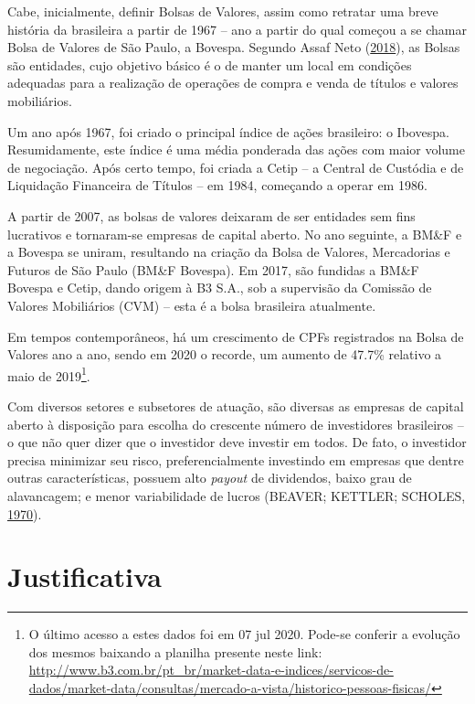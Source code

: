 \documentclass[grad,numbers]{coppe}
\begin{document}
  Cabe, inicialmente, definir Bolsas de Valores, assim como retratar uma breve história da brasileira a partir de 1967 -- ano a partir do qual começou a se chamar Bolsa de Valores de São Paulo, a Bovespa. Segundo Assaf Neto (\protect\hyperlink{ref-assafneto2018}{2018}), as Bolsas são entidades, cujo objetivo básico é o de manter um local em condições adequadas para a realização de operações de compra e venda de títulos e valores mobiliários.
  
  Um ano após 1967, foi criado o principal índice de ações brasileiro: o Ibovespa. Resumidamente, este índice é uma média ponderada das ações com maior volume de negociação. Após certo tempo, foi criada a Cetip -- a Central de Custódia e de Liquidação Financeira de Títulos -- em 1984, começando a operar em 1986.
  
  A partir de 2007, as bolsas de valores deixaram de ser entidades sem fins lucrativos e tornaram-se empresas de capital aberto. No ano seguinte, a BM\&F e a Bovespa se uniram, resultando na criação da Bolsa de Valores, Mercadorias e Futuros de São Paulo (BM\&F Bovespa). Em 2017, são fundidas a BM\&F Bovespa e Cetip, dando origem à B3 S.A., sob a supervisão da Comissão de Valores Mobiliários (CVM) -- esta é a bolsa brasileira atualmente.
  
  Em tempos contemporâneos, há um crescimento de CPFs registrados na Bolsa de Valores ano a ano, sendo em 2020 o recorde, um aumento de 47.7\% relativo a maio de 2019\footnote{O último acesso a estes dados foi em 07 jul 2020. Pode-se conferir a evolução dos mesmos baixando a planilha presente neste link: \url{http://www.b3.com.br/pt_br/market-data-e-indices/servicos-de-dados/market-data/consultas/mercado-a-vista/historico-pessoas-fisicas/}}.
  
  Com diversos setores e subsetores de atuação, são diversas as empresas de capital aberto à disposição para escolha do crescente número de investidores brasileiros -- o que não quer dizer que o investidor deve investir em todos. De fato, o investidor precisa minimizar seu risco, preferencialmente investindo em empresas que dentre outras características, possuem alto \emph{payout} de dividendos, baixo grau de alavancagem; e menor variabilidade de lucros (BEAVER; KETTLER; SCHOLES, \protect\hyperlink{ref-beaver1970}{1970}).
  
  \hypertarget{justificativa}{%
  \section{Justificativa}\label{justificativa}}
  
\end{document}
